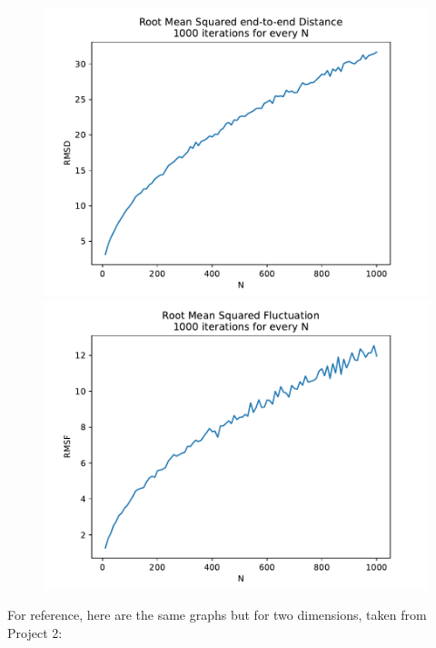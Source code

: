 \documentclass[a4paper,12pt]{article}
\begin{document}
\begin{figure}[!ht]
  \centering
  \begin{minipage}{0.49\textwidth}
    \includegraphics[width=\textwidth]{img/2-grid-rmsd.pdf}
  \end{minipage}
  \begin{minipage}{0.49\textwidth}
    \includegraphics[width=\textwidth]{img/2-grid-rmsf.pdf}
  \end{minipage}
\end{figure}

For reference, here are the same graphs but for two dimensions, taken from Project 2:
\end{document}
